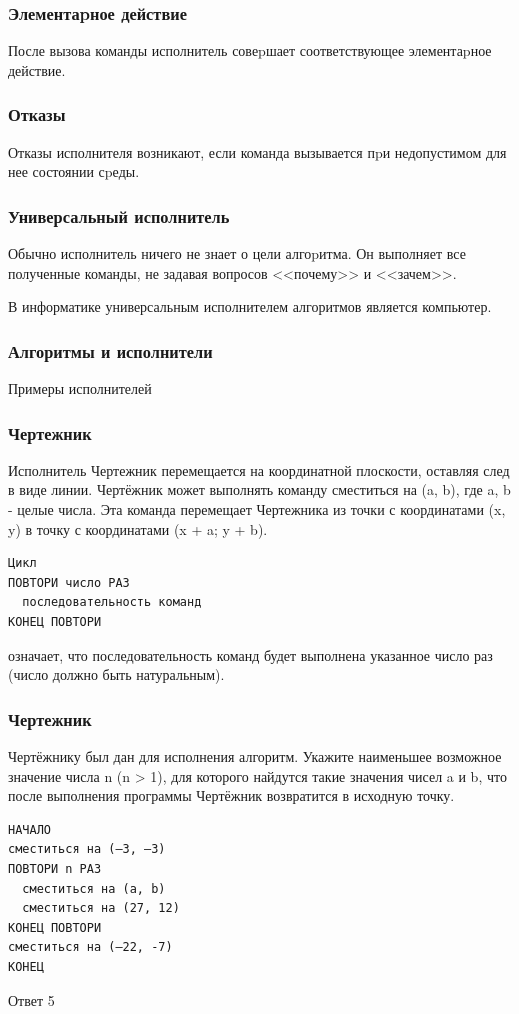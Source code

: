 \begin{frame}
\frametitle{Элементаpное действие}

После вызова команды исполнитель совеpшает соответствующее элементаpное действие.

\end{frame}

\begin{frame}
\frametitle{Отказы}

Отказы исполнителя возникают, если команда вызывается пpи недопустимом для нее состоянии сpеды.

\end{frame}

\begin{frame}
\frametitle{Универсальный исполнитель}

Обычно исполнитель ничего не знает о цели алгоpитма. Он выполняет все полученные команды, не задавая вопросов <<почему>> и <<зачем>>.

В информатике универсальным исполнителем алгоритмов является компьютер.
\end{frame}


\begin{frame}
\frametitle{Алгоритмы и исполнители}

\begin{center}

\Huge
Примеры исполнителей	
\end{center}
\end{frame}

\begin{frame}[fragile]
\frametitle{Чертежник}
Исполнитель Чертежник перемещается на координатной плоскости, оставляя след в виде линии. Чертёжник может выполнять команду сместиться на (a, b), где a, b - целые числа. Эта команда перемещает Чертежника из точки с координатами (x, y) в точку с координатами (x + a; y + b). 
\begin{verbatim}
Цикл
ПОВТОРИ число РАЗ
  последовательность команд
КОНЕЦ ПОВТОРИ
\end{verbatim}
означает, что последовательность команд будет выполнена указанное число раз (число должно быть натуральным). 

\end{frame}

\begin{frame}[fragile]
\frametitle{Чертежник}
Чертёжнику был дан для исполнения алгоритм. Укажите наименьшее возможное значение числа n (n > 1), для которого найдутся такие значения чисел a и b, что после выполнения программы Чертёжник возвратится в исходную точку.
\begin{verbatim}
НАЧАЛО
сместиться на (–3, –3)
ПОВТОРИ n РАЗ
  сместиться на (a, b)
  сместиться на (27, 12)
КОНЕЦ ПОВТОРИ
сместиться на (–22, -7)
КОНЕЦ
\end{verbatim}
\pause Ответ 5
 


\end{frame}



